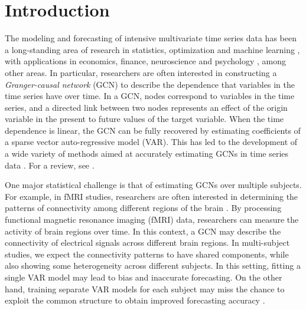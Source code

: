 

\section{Introduction}

The modeling and forecasting of intensive multivariate time series data has been a long-standing area of research in statistics, optimization and machine learning \citep{hamilton2020time}, with applications in economics, finance, neuroscience and psychology \citep{papana2017financial,kim2007unified,rogers2007assessing,deshpande2009multivariate,lane2019uncovering}, among other areas. In particular, researchers are often interested in constructing a \textit{Granger-causal network} (GCN) to describe the dependence that variables in the time series have over time. In a GCN, nodes correspond to variables in the time series, and a directed link between two nodes represents an effect of the origin variable in the present to future values of the target variable. When the time dependence is linear, the GCN can be fully recovered by estimating coefficients of a sparse vector auto-regressive model (VAR). This has led to the development of a wide variety of methods aimed at accurately estimating GCNs in time series data \citep{basu2015regularized,basu2015network,nicholson2017varx}. For a review, see \citet{wei2019multivariate}.

One major statistical challenge is that of estimating GCNs over multiple subjects. For example, in fMRI studies, researchers are often interested in determining the patterns of connectivity among different regions of the brain \citep{kim2007unified,rogers2007assessing,deshpande2009multivariate}. By processing functional magnetic resonance imaging (fMRI) data, researchers can measure the activity of brain regions over time. In this context, a GCN may describe the connectivity of electrical signals across different brain regions. In multi-subject studies, we expect the connectivity patterns to have shared components, while also showing some heterogeneity across different subjects. In this setting, fitting a single VAR model may lead to bias and inaccurate forecasting. On the other hand, training separate VAR models for each subject may miss the chance to exploit the common structure to obtain improved forecasting accuracy \citep{fisher2018lack}.  

